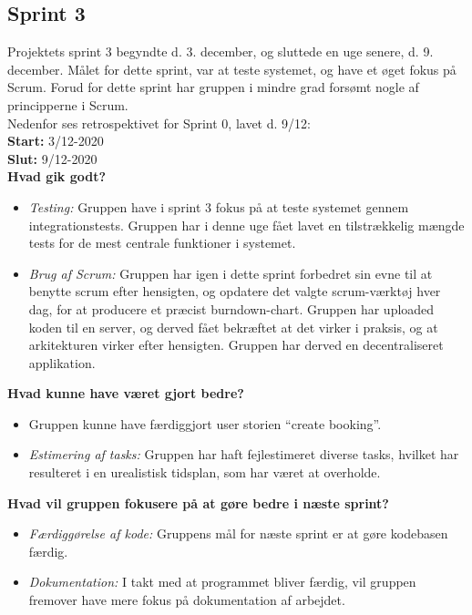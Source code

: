 \subsection{Sprint 3}
Projektets sprint 3 begyndte d. 3. december, og sluttede en uge senere, d. 9. december.
Målet for dette sprint, var at teste systemet, og have et øget fokus på Scrum. Forud for dette sprint
har gruppen i mindre grad forsømt nogle af principperne i Scrum. \\
Nedenfor ses retrospektivet for Sprint 0, lavet d. 9/12: \\

\textbf{Start:} 3/12-2020 \\
\textbf{Slut:} 9/12-2020 \\

\textbf{Hvad gik godt?}
\begin{itemize}
    \item \textit{Testing:} Gruppen have i sprint 3 fokus på at teste systemet gennem integrationstests. Gruppen har i denne uge fået 
    lavet en tilstrækkelig mængde tests for de mest centrale funktioner i systemet.
    \item \textit{Brug af Scrum:} Gruppen har igen i dette sprint forbedret sin evne til at benytte scrum efter hensigten, og opdatere 
    det valgte scrum-værktøj hver dag, for at producere et præcist burndown-chart.
    Gruppen har uploaded koden til en server, og derved fået bekræftet at det virker i praksis, og at arkitekturen virker efter hensigten. 
    Gruppen har derved en decentraliseret applikation.
\end{itemize}

\textbf{Hvad kunne have været gjort bedre?}
\begin{itemize}
    \item Gruppen kunne have færdiggjort user storien “create booking”.
    \item \textit{Estimering af tasks:} Gruppen har haft fejlestimeret diverse tasks, hvilket har resulteret i en urealistisk tidsplan, som har været
    at overholde.
\end{itemize}

\textbf{Hvad vil gruppen fokusere på at gøre bedre i næste sprint?}
\begin{itemize}
    \item \textit{Færdiggørelse af kode:} Gruppens mål for næste sprint er at gøre kodebasen færdig.
    \item \textit{Dokumentation:} I takt med at programmet bliver færdig, vil gruppen fremover have mere fokus på dokumentation af arbejdet.
\end{itemize}
